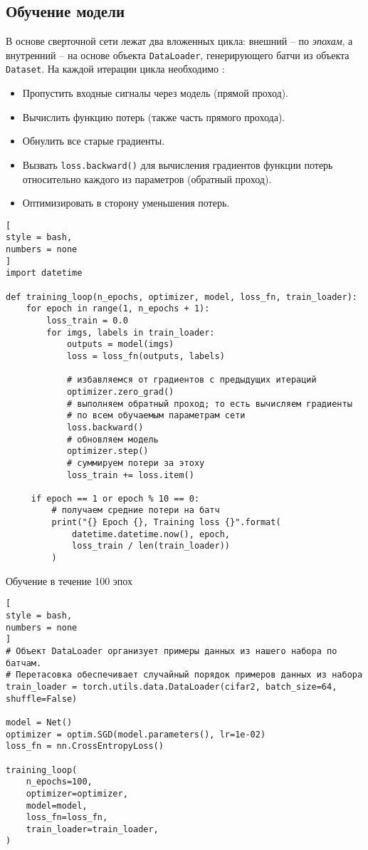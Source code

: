 \documentclass[%
	11pt,
	a4paper,
	utf8,
		]{article}
\begin{document}
\subsection{Обучение модели}

В основе сверточной сети лежат два вложенных цикла: внешний -- по \emph{эпохам}, а внутренний -- на основе объекта \verb|DataLoader|, генерирующего батчи из объекта \verb|Dataset|. На каждой итерации цикла необходимо \cite[]{pytorch-2022}:
\begin{itemize}
	\item Пропустить входные сигналы через модель (прямой проход).
	
	\item Вычислить функцию потерь (также часть прямого прохода).
	
	\item Обнулить все старые градиенты.
	
	\item Вызвать \verb|loss.backward()| для вычисления градиентов функции потерь относительно каждого из параметров (обратный проход).
	
	\item Оптимизировать в сторону уменьшения потерь.
\end{itemize}

\begin{lstlisting}[
style = bash,
numbers = none
]
import datetime

def training_loop(n_epochs, optimizer, model, loss_fn, train_loader):
    for epoch in range(1, n_epochs + 1):
        loss_train = 0.0
        for imgs, labels in train_loader:
            outputs = model(imgs)
            loss = loss_fn(outputs, labels)
            
            # избавляемся от градиентов с предыдущих итераций
            optimizer.zero_grad()
            # выполняем обратный проход; то есть вычисляем градиенты
            # по всем обучаемым параметрам сети
            loss.backward()
            # обновляем модель
            optimizer.step()
            # суммируем потери за этоху
            loss_train += loss.item()
            
     if epoch == 1 or epoch % 10 == 0:
         # получаем средние потери на батч
         print("{} Epoch {}, Training loss {}".format(
             datetime.datetime.now(), epoch,
             loss_train / len(train_loader))
         )
\end{lstlisting}

Обучение в течение 100 эпох
\begin{lstlisting}[
style = bash,
numbers = none
]
# Объект DataLoader организует примеры данных из нашего набора по батчам.
# Перетасовка обеспечивает случайный порядок примеров данных из набора
train_loader = torch.utils.data.DataLoader(cifar2, batch_size=64, shuffle=False)

model = Net()
optimizer = optim.SGD(model.parameters(), lr=1e-02)
loss_fn = nn.CrossEntropyLoss()

training_loop(
    n_epochs=100,
    optimizer=optimizer,
    model=model,
    loss_fn=loss_fn,
    train_loader=train_loader,
)
\end{lstlisting}
\end{document}
